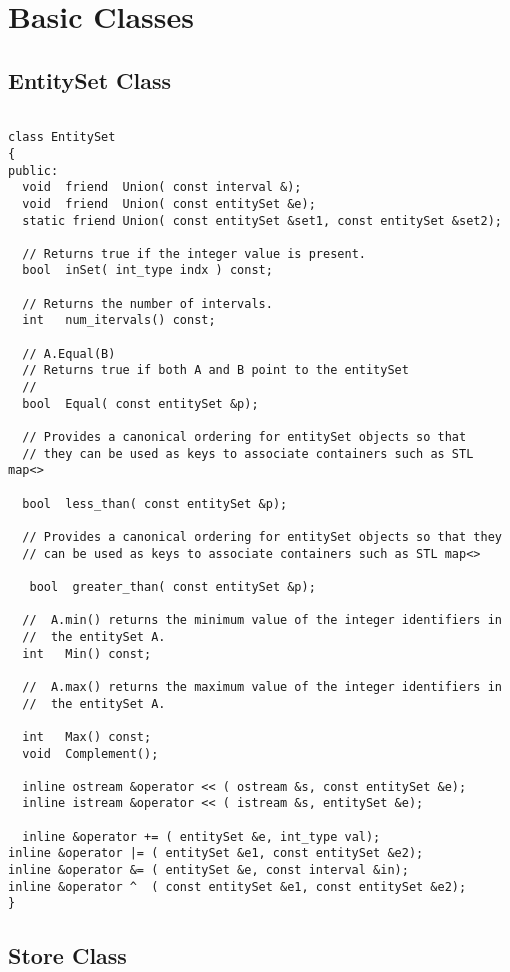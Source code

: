 \appendix
\chapter { Basic Classes}

\section { EntitySet Class }
\begin{verbatim}

class EntitySet 
{
public:
  void  friend  Union( const interval &);
  void  friend  Union( const entitySet &e);
  static friend Union( const entitySet &set1, const entitySet &set2);

  // Returns true if the integer value is present.
  bool  inSet( int_type indx ) const;

  // Returns the number of intervals.
  int   num_itervals() const;

  // A.Equal(B)
  // Returns true if both A and B point to the entitySet 
  //
  bool  Equal( const entitySet &p);

  // Provides a canonical ordering for entitySet objects so that
  // they can be used as keys to associate containers such as STL map<>

  bool  less_than( const entitySet &p);

  // Provides a canonical ordering for entitySet objects so that they
  // can be used as keys to associate containers such as STL map<> 

   bool  greater_than( const entitySet &p);

  //  A.min() returns the minimum value of the integer identifiers in 
  //  the entitySet A.
  int   Min() const;

  //  A.max() returns the maximum value of the integer identifiers in 
  //  the entitySet A.

  int   Max() const;
  void  Complement();

  inline ostream &operator << ( ostream &s, const entitySet &e);
  inline istream &operator << ( istream &s, entitySet &e);

  inline &operator += ( entitySet &e, int_type val);
inline &operator |= ( entitySet &e1, const entitySet &e2);
inline &operator &= ( entitySet &e, const interval &in);
inline &operator ^  ( const entitySet &e1, const entitySet &e2);
}
\end{verbatim}


\section { Store Class }

